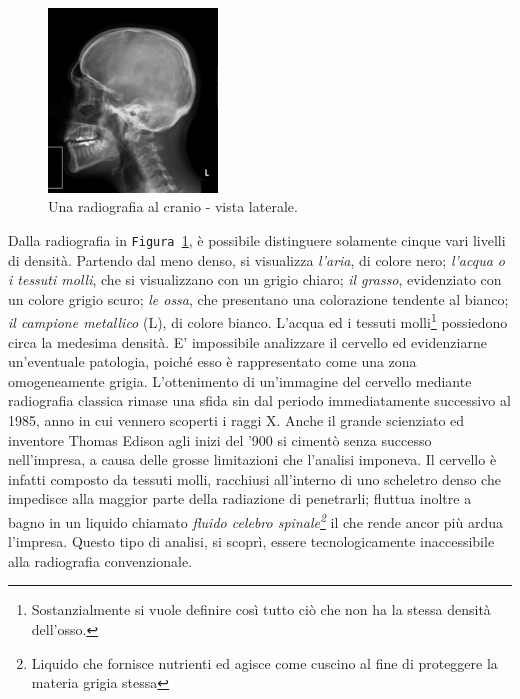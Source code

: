 \documentclass[a4paper,12pt, doubleside]{report}
\begin{document}
                    \begin{figure}[h]
                        \centering
                        \includegraphics[width=0.4\textwidth]{radiografia}
                        \caption{Una radiografia al cranio - vista laterale.}
                        \label{fig:skull}
                    \end{figure}
                        
                    \bigskip
                    Dalla radiografia in \texttt{Figura \ref{fig:skull}}, è possibile distinguere solamente cinque vari livelli di densità. Partendo dal meno denso, si visualizza \textit{l'aria}, di colore nero; \textit{l'acqua o i tessuti molli}, che si visualizzano con un grigio chiaro; \textit{il grasso}, evidenziato con un colore grigio scuro; \textit{le ossa}, che presentano una colorazione tendente al bianco; \textit{il campione metallico} (L), di colore bianco. L’acqua ed i tessuti molli\footnote{Sostanzialmente si vuole definire così tutto ciò che non ha la stessa densità dell'osso.} possiedono circa la medesima densità. E' impossibile analizzare il cervello ed evidenziarne un'eventuale patologia, poiché esso è rappresentato come una zona omogeneamente grigia. L'ottenimento di un'immagine del cervello mediante radiografia classica rimase una sfida sin dal periodo immediatamente successivo al 1985, anno in cui vennero scoperti i raggi X. Anche il grande scienziato ed inventore Thomas Edison agli inizi del '900 si cimentò senza successo nell'impresa, a causa delle grosse limitazioni che l'analisi imponeva.\cite{thomas-edison-brain} Il cervello è infatti composto da tessuti molli, racchiusi all’interno di uno scheletro denso che impedisce alla maggior parte della radiazione di penetrarli; fluttua inoltre a bagno in un liquido chiamato \textit{fluido celebro spinale\footnote{Liquido che fornisce nutrienti ed agisce come cuscino al fine di proteggere la materia grigia stessa}} il che rende ancor più ardua l'impresa. Questo tipo di analisi, si scoprì, essere tecnologicamente inaccessibile alla radiografia convenzionale.
                
\end{document}
